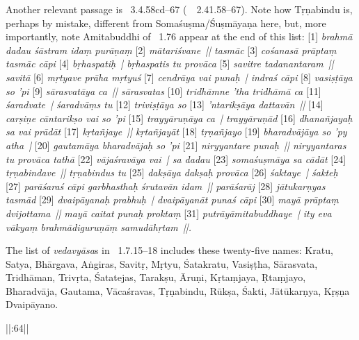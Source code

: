 {{   %
  Another relevant passage is \BrahmandaPur\ 3.4.58cd--67 {\rm (}\similar\ \VayuP\ 2.41.58--67{\rm )}.
  Note how Tṛṇabindu is, perhaps by mistake, different from Somaśuṣma/Śuṣmāyaṇa here,
  but, more importantly, note Amitabuddhi of \VSS\ 1.76 appear at the end of this list:
  [1] \textit{brahmā dadau śāstram idaṃ purāṇaṃ }[2]\textit{ mātariśvane~||  
  tasmāc }[3]\textit{ cośanasā prāptaṃ tasmāc cāpi }[4]\textit{ bṛhaspatiḥ~|  
  bṛhaspatis tu provāca }[5]\textit{ savitre tadanantaram~||  
  savitā }[6]\textit{ mṛtyave prāha mṛtyuś }[7]\textit{ cendrāya vai punaḥ~|  
  indraś cāpi }[8]\textit{ vasiṣṭāya so 'pi }[9]\textit{ sārasvatāya ca~||  
  sārasvatas }[10]\textit{ tridhāmne 'tha tridhāmā ca }[11]\textit{ śaradvate~|  
  śaradvāṃs tu }[12]\textit{ triviṣṭāya so }[13]\textit{ 'ntarikṣāya dattavān~||  
  }[14]\textit{ carṣiṇe cāntarikṣo vai so 'pi }[15]\textit{ trayyāruṇāya ca~|  
  trayyāruṇād }[16]\textit{ dhanañjayaḥ sa vai prādāt }[17]\textit{ kṛtañjaye~||  
  kṛtañjayāt }[18]\textit{ tṛṇañjayo }[19]\textit{ bharadvājāya so 'py atha~|  
  }[20]\textit{ gautamāya bharadvājaḥ so 'pi }[21]\textit{ niryyantare punaḥ~||  
  niryyantaras tu provāca tathā }[22]\textit{ vājaśravāya vai~|  
  sa dadau }[23]\textit{ somaśuṣmāya sa cādāt }[24]\textit{ tṛṇabindave~||  
  tṛṇabindus tu }[25]\textit{ dakṣāya dakṣaḥ provāca }[26]\textit{ śaktaye~|  
  śakteḥ }[27]\textit{ parāśaraś cāpi garbhasthaḥ śrutavān idam~||  
  parāśarāj }[28]\textit{ jātukarṇyas tasmād }[29]\textit{ dvaipāyanaḥ prabhuḥ~|  
  dvaipāyanāt punaś cāpi }[30]\textit{ mayā prāptaṃ dvijottama~||  
  mayā caitat punaḥ proktaṃ }[31]\textit{ putrāyāmitabuddhaye~|  
  ity eva vākyaṃ brahmādiguruṇāṃ samudāhṛtam~||.}  
 
  The list of \textit{vedavyāsa}s in \LinPu\ 1.7.15--18 includes these twenty-five names:
  Kratu, Satya, Bhārgava, Aṅgiras, Savitṛ,
  Mṛtyu, Śatakratu, Vasiṣṭha, Sārasvata, Tridhāman,
  Trivṛta, Śatatejas, Tarakṣu, Āruṇi, Kṛtaṃjaya,
  Ṛtaṃjayo, Bharadvāja, Gautama, Vācaśravas, Tṛṇabindu,
  Rūkṣa, Śakti, Jātūkarṇya, Kṛṣṇa Dvaipāyano.
 }}


  ||:64\thinspace||%


